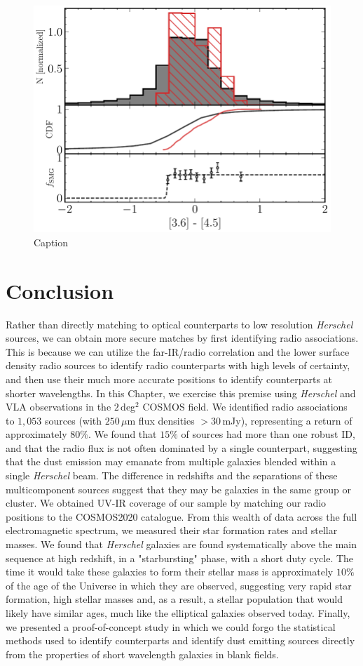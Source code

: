 \begin{figure}
	\includegraphics[width=0.49\columnwidth, height=0.3\textheight]{Figures/3645_smg.pdf}
	\caption[{\color{red}Caption}]{{\color{red}Caption}}
	\label{fig:smg_nonsmg}
\end{figure}

\section{Conclusion}

Rather than directly matching to optical counterparts to low resolution \textit{Herschel} sources, we can obtain more secure matches by first identifying radio associations. This is because we can utilize the far-IR/radio correlation and the lower surface density radio sources to identify radio counterparts with high levels of certainty, and then use their much more accurate positions to identify counterparts at shorter wavelengths. In this Chapter, we exercise this premise using \textit{Herschel} and VLA observations in the $2\,$deg$^2$ COSMOS field. We identified radio associations to $1,053$ sources (with $250\,\mu$m flux densities $> 30\,$mJy), representing a return of approximately $80\%$. We found that $15\%$ of sources had more than one robust ID, and that the radio flux is not often dominated by a single counterpart, suggesting that the dust emission may emanate from multiple galaxies blended within a single \textit{Herschel} beam. The difference in redshifts and the separations of these multicomponent sources suggest that they may be galaxies in the same group or cluster. We obtained UV-IR coverage of our sample by matching our radio positions to the COSMOS2020 catalogue. From this wealth of data across the full electromagnetic spectrum, we measured their star formation rates and stellar masses. We found that \textit{Herschel} galaxies are found systematically above the main sequence at high redshift, in a "starbursting" phase, with a short duty cycle. The time it would take these galaxies to form their stellar mass is approximately $10\%$ of the age of the Universe in which they are observed, suggesting very rapid star formation, high stellar masses and, as a result, a stellar population that would likely have similar ages, much like the elliptical galaxies observed today. Finally, we presented a proof-of-concept study in which we could forgo the statistical methods used to identify counterparts and identify dust emitting sources directly from the properties of short wavelength galaxies in blank fields.
